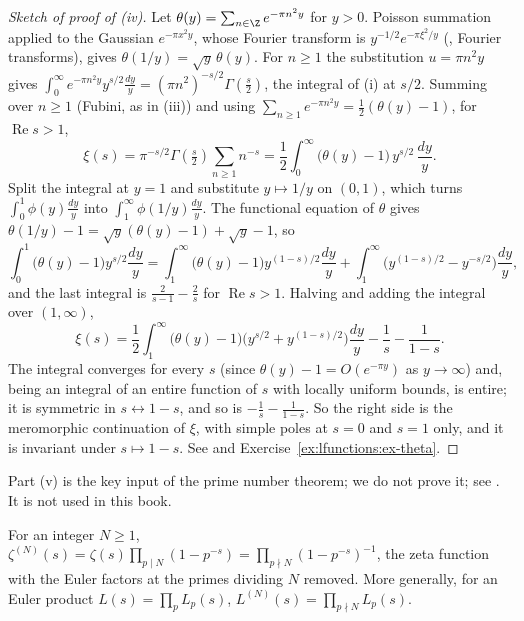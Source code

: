 \begin{proof}[Sketch of proof of (iv)]
Let $\theta(y)=\sum_{n\in\Z}e^{-\pi n^2y}$ for $y>0$. Poisson summation applied to the Gaussian $e^{-\pi x^2y}$, whose Fourier transform is $y^{-1/2}e^{-\pi\xi^2/y}$ (\cite{RHB06},
Fourier transforms), gives $\theta(1/y)=\sqrt y\,\theta(y)$. For $n\ge1$ the substitution $u=\pi n^2y$ gives $\int_0^\infty e^{-\pi n^2y}y^{s/2}\frac{dy}y=(\pi n^2)^{-s/2}\Gamma(\frac s2)$,
the integral of (i) at $s/2$. Summing over $n\ge1$ (Fubini, as in (iii)) and using $\sum_{n\ge1}e^{-\pi n^2y}=\frac12(\theta(y)-1)$,
for $\operatorname{Re}s>1$,
\[
\xi(s)=\pi^{-s/2}\Gamma(\tfrac s2)\sum_{n\ge1}n^{-s}=\frac12\int_0^\infty\bigl(\theta(y)-1\bigr)\,y^{s/2}\,\frac{dy}y .
\]
Split the integral at $y=1$ and substitute $y\mapsto1/y$ on $(0,1)$, which turns $\int_0^1\phi(y)\frac{dy}y$ into $\int_1^\infty\phi(1/y)\frac{dy}y$. The functional equation of $\theta$ gives
$\theta(1/y)-1=\sqrt y(\theta(y)-1)+\sqrt y-1$, so
\[
\int_0^1\bigl(\theta(y)-1\bigr)y^{s/2}\frac{dy}y=\int_1^\infty\bigl(\theta(y)-1\bigr)y^{(1-s)/2}\frac{dy}y+\int_1^\infty\bigl(y^{(1-s)/2}-y^{-s/2}\bigr)\frac{dy}y,
\]
and the last integral is $\frac2{s-1}-\frac2s$ for $\operatorname{Re}s>1$. Halving and adding the integral over $(1,\infty)$,
\[
\xi(s)=\frac12\int_1^\infty\bigl(\theta(y)-1\bigr)\bigl(y^{s/2}+y^{(1-s)/2}\bigr)\frac{dy}y-\frac1s-\frac1{1-s}.
\]
The integral converges for every $s$ (since $\theta(y)-1=O(e^{-\pi y})$ as $y\to\infty$) and, being an integral of an entire function of $s$ with locally uniform bounds, is
entire; it is symmetric in $s\leftrightarrow1-s$, and so is $-\frac1s-\frac1{1-s}$. So the right side is the meromorphic continuation of $\xi$, with simple poles at $s=0$ and $s=1$
only, and it is invariant under $s\mapsto1-s$. See \cite{Davenport00} and Exercise~\ref{ex:lfunctions:ex-theta}.
\end{proof}

Part (v) is the key input of the prime number theorem; we do not prove it; see \cite{Davenport00}. It is not used in this book.

\begin{definition}\label{def:lfunctions:partial-zeta}
For an integer $N\ge1$, $\zeta^{(N)}(s)=\zeta(s)\prod_{p\mid N}(1-p^{-s})=\prod_{p\nmid N}(1-p^{-s})^{-1}$, the zeta function with the Euler factors at the primes dividing $N$ removed.
More generally, for an Euler product $L(s)=\prod_pL_p(s)$, $L^{(N)}(s)=\prod_{p\nmid N}L_p(s)$.
\end{definition}

